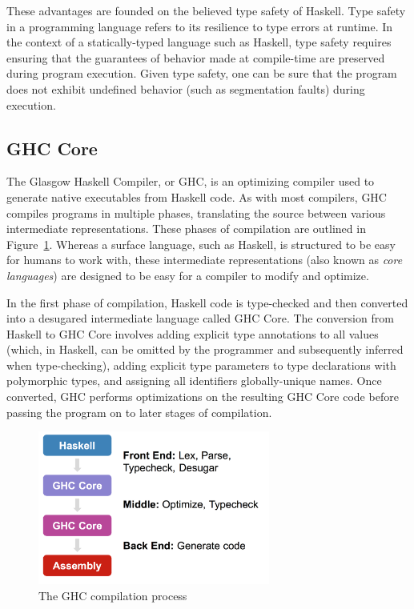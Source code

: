 \documentclass{sig-alternate}
\begin{document}
These advantages are founded on the believed type safety of Haskell. Type safety in a programming language refers to its resilience to type errors at runtime. In the context of a statically-typed language such as Haskell, type safety requires ensuring that the guarantees of behavior made at compile-time are preserved during program execution. Given type safety, one can be sure that the program does not exhibit undefined behavior (such as segmentation faults) during execution.

\subsection{GHC Core}
\label{sec:background-ghc-core}

The Glasgow Haskell Compiler, or GHC, is an optimizing compiler used to generate native executables from Haskell code. As with most compilers, GHC compiles programs in multiple phases, translating the source between various intermediate representations. These phases of compilation are outlined in Figure~\ref{fig:desgar}. Whereas a surface language, such as Haskell, is structured to be easy for humans to work with, these intermediate representations (also known as {\em core languages}) are designed to be easy for a compiler to modify and optimize.

In the first phase of compilation, Haskell code is type-checked and then converted into a desugared intermediate language called GHC Core. The conversion from Haskell to GHC Core involves adding explicit type annotations to all values (which, in Haskell, can be omitted by the programmer and subsequently inferred when type-checking), adding explicit type parameters to type declarations with polymorphic types, and assigning all identifiers globally-unique names. Once converted, GHC performs optimizations on the resulting GHC Core code before passing the program on to later stages of compilation.

\begin{figure}[h!]
  \centering
  \includegraphics[max width=3in]{desgar.png}
  \caption{The GHC compilation process}
  \label{fig:desgar}
\end{figure}
\end{document}

